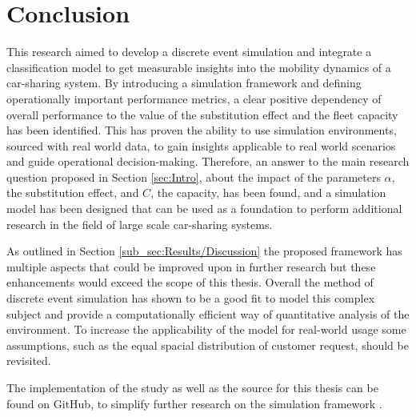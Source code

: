 \section{Conclusion}
\label{sec:Conclusion}

This research aimed to develop a discrete event simulation and integrate a classification model
to get measurable insights into the mobility dynamics of a car-sharing system. By introducing a
simulation framework and defining operationally important performance metrics, a clear
positive dependency of overall performance to the value of the substitution effect and the
fleet capacity has been identified. This has proven the ability to use simulation environments, 
sourced with real world data, to gain insights applicable to real world scenarios and guide
operational decision-making. Therefore, an answer to the main research question proposed in Section \ref{sec:Intro},
about the impact of the parameters $\alpha$, the substitution effect, and $C$, the capacity,
has been found, and a simulation model has been designed 
that can be used as a foundation to perform additional research in the field of large
scale car-sharing systems.

As outlined in Section \ref{sub_sec:Results/Discussion} the
proposed framework has multiple aspects that could be improved upon in further research but these
enhancements would
exceed the scope of this thesis. Overall the method of discrete event simulation has shown to be a
good fit to model this complex subject and provide a computationally efficient way of
quantitative analysis of the environment. To increase the applicability of the model for real-world
usage some assumptions, such as the equal spacial distribution of customer request, should be
revisited.

The implementation of the study as well as the source for this thesis can be found on GitHub, to 
simplify further research on the simulation framework .